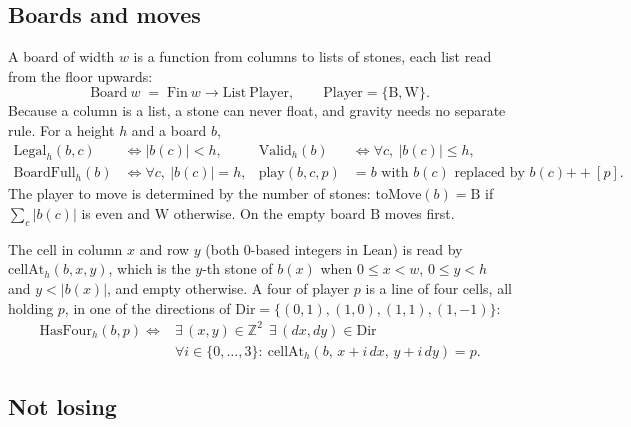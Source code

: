 \documentclass[11pt,a4paper]{article}
\theoremstyle{plain}
\theoremstyle{definition}
\newcommand{\B}{\mathrm{B}}
\newcommand{\W}{\mathrm{W}}
\newcommand{\HasFour}{\mathrm{HasFour}}
\begin{document}
\subsection{Boards and moves}

A board of width $w$ is a function from columns to lists of stones, each list read from the floor upwards:
\[
  \mathrm{Board}\ w \;=\; \mathrm{Fin}\ w \to \mathrm{List}\ \mathrm{Player},\qquad \mathrm{Player}=\{\B,\W\}.
\]
Because a column is a list, a stone can never float, and gravity needs no separate rule. For a height $h$ and a board $b$,
\begin{align*}
  \mathrm{Legal}_h(b,c) &\iff |b(c)| < h, &
  \mathrm{Valid}_h(b) &\iff \forall c,\ |b(c)|\le h,\\
  \mathrm{BoardFull}_h(b) &\iff \forall c,\ |b(c)| = h, &
  \mathrm{play}(b,c,p) &= b \text{ with } b(c) \text{ replaced by } b(c)\mathbin{+\!\!+}[p].
\end{align*}
The player to move is determined by the number of stones: $\mathrm{toMove}(b)=\B$ if $\sum_c |b(c)|$ is even and $\W$ otherwise. On the empty board $\B$ moves first.

The cell in column $x$ and row $y$ (both $0$-based integers in Lean) is read by $\mathrm{cellAt}_h(b,x,y)$, which is the $y$-th stone of $b(x)$ when $0\le x<w$, $0\le y<h$ and $y<|b(x)|$, and empty otherwise. A four of player $p$ is a line of four cells, all holding $p$, in one of the directions of $\mathrm{Dir}=\{(0,1),(1,0),(1,1),(1,-1)\}$:
\begin{align*}
  \HasFour_h(b,p) \iff{}& \exists\, (x,y)\in\mathbb Z^2\ \ \exists\,(dx,dy)\in\mathrm{Dir}\\
  & \forall i\in\{0,\dots,3\}:\ \mathrm{cellAt}_h(b,\,x+i\,dx,\,y+i\,dy)=p.
\end{align*}

\subsection{Not losing}
\end{document}
